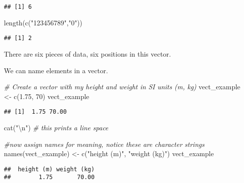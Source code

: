 \documentclass[
]{article}
\newenvironment{Shaded}{\begin{snugshade}}{\end{snugshade}}
\newcommand{\CommentTok}[1]{\textcolor[rgb]{0.56,0.35,0.01}{\textit{#1}}}
\newcommand{\DecValTok}[1]{\textcolor[rgb]{0.00,0.00,0.81}{#1}}
\newcommand{\FloatTok}[1]{\textcolor[rgb]{0.00,0.00,0.81}{#1}}
\newcommand{\FunctionTok}[1]{\textcolor[rgb]{0.00,0.00,0.00}{#1}}
\newcommand{\NormalTok}[1]{#1}
\newcommand{\OtherTok}[1]{\textcolor[rgb]{0.56,0.35,0.01}{#1}}
\newcommand{\SpecialCharTok}[1]{\textcolor[rgb]{0.00,0.00,0.00}{#1}}
\newcommand{\StringTok}[1]{\textcolor[rgb]{0.31,0.60,0.02}{#1}}
\begin{document}
\begin{verbatim}
## [1] 6
\end{verbatim}

\begin{Shaded}
\begin{Highlighting}[]
\FunctionTok{length}\NormalTok{(}\FunctionTok{c}\NormalTok{(}\StringTok{"123456789"}\NormalTok{,}\StringTok{"0"}\NormalTok{))}
\end{Highlighting}
\end{Shaded}

\begin{verbatim}
## [1] 2
\end{verbatim}

There are six pieces of data, six positions in this vector.

We can name elements in a vector.

\begin{Shaded}
\begin{Highlighting}[]
\CommentTok{\# Create a vector with my height and weight in SI units (m, kg)}
\NormalTok{vect\_example }\OtherTok{\textless{}{-}} \FunctionTok{c}\NormalTok{(}\FloatTok{1.75}\NormalTok{, }\DecValTok{70}\NormalTok{)}
\NormalTok{vect\_example}
\end{Highlighting}
\end{Shaded}

\begin{verbatim}
## [1]  1.75 70.00
\end{verbatim}

\begin{Shaded}
\begin{Highlighting}[]
\FunctionTok{cat}\NormalTok{(}\StringTok{"}\SpecialCharTok{\textbackslash{}n}\StringTok{"}\NormalTok{)   }\CommentTok{\# this prints a line space}
\end{Highlighting}
\end{Shaded}

\begin{Shaded}
\begin{Highlighting}[]
\CommentTok{\#now assign names for meaning, notice these are character strings}
\FunctionTok{names}\NormalTok{(vect\_example) }\OtherTok{\textless{}{-}} \FunctionTok{c}\NormalTok{(}\StringTok{"height (m)"}\NormalTok{, }\StringTok{"weight (kg)"}\NormalTok{)}
\NormalTok{vect\_example}
\end{Highlighting}
\end{Shaded}

\begin{verbatim}
##  height (m) weight (kg) 
##        1.75       70.00
\end{verbatim}
\end{document}
